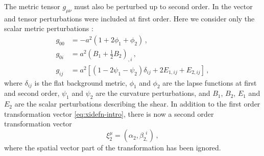 The metric tensor $g_{\mu\nu}$ must also be perturbed up to second order. In
 the vector and tensor perturbations were included at first
order. Here we consider only the scalar metric perturbations \cite{Malik:2008im}:
%
\begin{align}
\label{eq:metric1-num}
%
g_{00}&= -a^2\left(1+2\phi_1+\phi_2\right) \,, \nonumber\\
%
g_{0i}&= a^2\left(B_1+\frac{1}{2}B_2\right)_{,i}\,, \nonumber\\
%
g_{ij}&= a^2\left[\left(1-2\psi_1-\psi_2\right)\delta_{ij}
+2E_{1,ij}+E_{2,ij}\right]\,,
\end{align}
%
where $\delta_{ij}$ is the flat background metric, $\phi_1$ and $\phi_2$ are the
lapse functions at first and second order, $\psi_1$ and $\psi_2$ are the curvature
perturbations, and $B_1$, $B_2$, $E_1$ and $E_2$ are the
scalar perturbations describing the shear.
% 
In addition to the first order transformation vector \eqref{eq:xidefn-intro}, there
is
now a second order transformation vector
% 
\begin{equation}
 \label{eq:xi2defn-perts}
\xi_2^\mu = (\alpha_2, \beta_{2,}^{~~i}) \,,
\end{equation}
% 
where the spatial vector part of the transformation has been ignored. 

